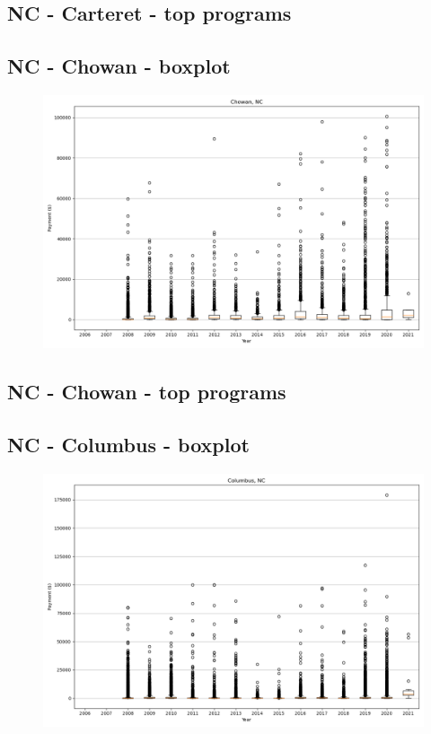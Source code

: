 \subsection*{NC - Carteret - top programs}

\newpage
\subsection*{NC - Chowan - boxplot}
\begin{figure}[h]
\centering
\includegraphics[width=7in]{../output/boxplots/counties/Chowan-NC_boxplot.png}
\end{figure}


\subsection*{NC - Chowan - top programs}

\newpage
\subsection*{NC - Columbus - boxplot}
\begin{figure}[h]
\centering
\includegraphics[width=7in]{../output/boxplots/counties/Columbus-NC_boxplot.png}
\end{figure}


